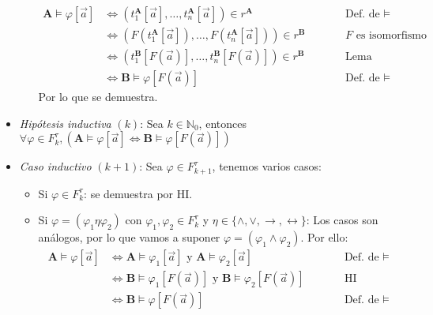 \documentclass{article}
\begin{document}
\begin{itemize}
\begin{itemize}
\begin{equation*}
\begin{alignedat}{2}
                    \mathbf{A}\vDash\varphi[\vec{a}] & \iff(t_1^\mathbf{A}[\vec{a}],\dots,t_n^\mathbf{A}[\vec{a}])\in r^\mathbf{A}       &  & \qquad\text{Def. de }\vDash    \\
                                                     & \iff(F(t_1^\mathbf{A}[\vec{a}]),\dots,F(t_n^\mathbf{A}[\vec{a}]))\in r^\mathbf{B} &  & \qquad F\text{ es isomorfismo} \\
                                                     & \iff(t_1^\mathbf{B}[F(\vec{a})],\dots,t_n^\mathbf{B}[F(\vec{a})])\in r^\mathbf{B} &  & \qquad\text{Lema}              \\
                                                     & \iff\mathbf{B}\vDash\varphi[F(\vec{a})]                                           &  & \qquad\text{Def. de }\vDash
                  \end{alignedat}
                \end{equation*}
                Por lo que se demuestra.
        \end{itemize}
  \item \textit{Hipótesis inductiva} $(k)$: Sea $k\in\mathbb{N}_0$, entonces $\forall\varphi\in F^\tau_k,(\mathbf{A}\vDash\varphi[\vec{a}]\iff\mathbf{B}\vDash\varphi[F(\vec{a})])$
  \item \textit{Caso inductivo} $(k+1)$: Sea $\varphi\in F^\tau_{k+1}$, tenemos varios casos:
        \begin{itemize}
          \item Si $\varphi\in F^\tau_k$: se demuestra por HI.
          \item Si $\varphi=(\varphi_1\eta\varphi_2)$ con $\varphi_1,\varphi_2\in F^\tau_k$ y $\eta\in\{\land,\lor,\to,\leftrightarrow\}$: Los casos son análogos, por lo que vamos a suponer $\varphi=(\varphi_1\land\varphi_2)$. Por ello:
                \begin{equation*}
                  \begin{alignedat}{2}
                    \mathbf{A}\vDash\varphi[\vec{a}] & \iff\mathbf{A}\vDash\varphi_1[\vec{a}]\text{ y }\mathbf{A}\vDash\varphi_2[\vec{a}]       &  & \qquad\text{Def. de }\vDash \\
                                                     & \iff\mathbf{B}\vDash\varphi_1[F(\vec{a})]\text{ y }\mathbf{B}\vDash\varphi_2[F(\vec{a})] &  & \qquad\text{HI}             \\
                                                     & \iff\mathbf{B}\vDash\varphi[F(\vec{a})]                                                  &  & \qquad\text{Def. de }\vDash

\end{alignedat}
\end{equation*}
\end{itemize}
\end{itemize}
\end{document}
